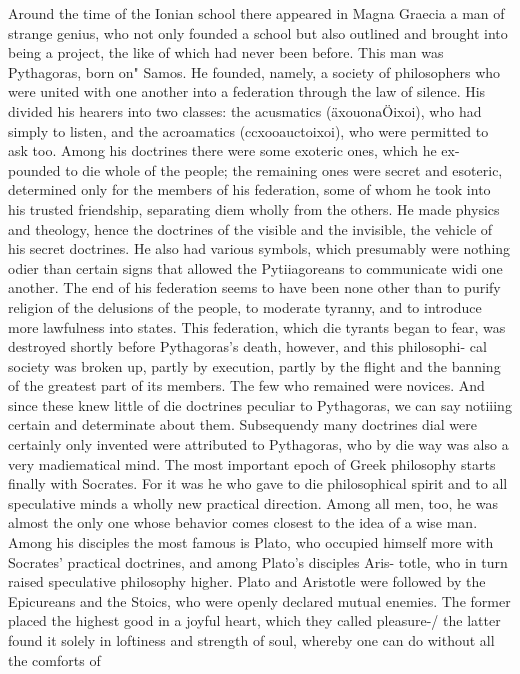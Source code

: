 Around the time of the Ionian school there appeared in Magna Graecia a
man of strange genius, who not only founded a school but also outlined
and brought into being a project, the like of which had never been before.
This man was Pythagoras, born on" Samos. He founded, namely, a society
of philosophers who were united with one another into a federation
through the law of silence. His divided his hearers into two classes: the
acusmatics (äxouonaÖixoi), who had simply to listen, and the acroamatics
(ccxooauctoixoi), who were permitted to ask too.
Among his doctrines there were some exoteric ones, which he ex-
pounded to die whole of the people; the remaining ones were secret and
esoteric, determined only for the members of his federation, some of whom
he took into his trusted friendship, separating diem wholly from the
others. He made physics and theology, hence the doctrines of the visible
and the invisible, the vehicle of his secret doctrines. He also had various
symbols, which presumably were nothing odier than certain signs that
allowed the Pytiiagoreans to communicate widi one another.
The end of his federation seems to have been none other than to purify
religion of the delusions of the people, to moderate tyranny, and to introduce more
lawfulness into states. This federation, which die tyrants began to fear, was
destroyed shortly before Pythagoras's death, however, and this philosophi-
cal society was broken up, partly by execution, partly by the flight and the
banning of the greatest part of its members. The few who remained were
novices. And since these knew little of die doctrines peculiar to Pythagoras,
we can say notiiing certain and determinate about them. Subsequendy
many doctrines dial were certainly only invented were attributed to
Pythagoras, who by die way was also a very madiematical mind.
The most important epoch of Greek philosophy starts finally with Socrates.
For it was he who gave to die philosophical spirit and to all speculative
minds a wholly new practical direction. Among all men, too, he was almost
the only one whose behavior comes closest to the idea of a wise man.
Among his disciples the most famous is Plato, who occupied himself
more with Socrates' practical doctrines, and among Plato's disciples Aris-
totle, who in turn raised speculative philosophy higher.
Plato and Aristotle were followed by the Epicureans and the Stoics, who
were openly declared mutual enemies. The former placed the highest good
in a joyful heart, which they called pleasure-/ the latter found it solely in
loftiness and strength of soul, whereby one can do without all the comforts of
